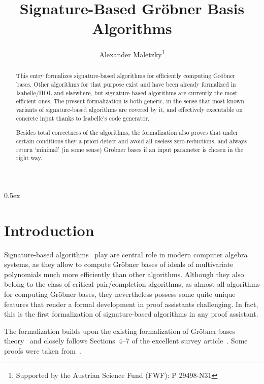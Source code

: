 \documentclass[11pt,a4paper]{article}
\begin{document}
\title{Signature-Based Gr\"obner Basis Algorithms}
\author{Alexander Maletzky\thanks{Supported by the Austrian Science Fund (FWF): P 29498-N31}}
\maketitle

\begin{abstract}
This entry formalizes signature-based algorithms for efficiently computing Gr\"obner bases. 
Other algorithms for that purpose exist and have been already formalized in Isabelle/HOL and 
elsewhere, but signature-based algorithms are currently the most efficient ones. The present 
formalization is both generic, in the sense that most known variants of signature-based algorithms 
are covered by it, and effectively executable on concrete input thanks to Isabelle's code generator.

Besides total correctness of the algorithms, the formalization also proves that under certain 
conditions they a-priori detect and avoid all useless zero-reductions, and always return `minimal' 
(in some sense) Gr\"obner bases if an input parameter is chosen in the right way.
\end{abstract}

\tableofcontents

\parindent 0pt\parskip 0.5ex

\newpage
\section{Introduction}

Signature-based algorithms~\cite{Faugere2002,Eder2017} play are central role in modern computer 
algebra systems, as they allow to compute Gr\"obner bases of ideals of multivariate polynomials much 
more efficiently than other algorithms. Although they also belong to the class of 
critical-pair/completion algorithms, as almost all algorithms for computing Gr\"obner bases, they 
nevertheless possess some quite unique features that render a formal development in proof assistants 
challenging. In fact, this is the first formalization of signature-based algorithms in any proof 
assistant.

The formalization builds upon the existing formalization of Gr\"obner bases 
theory~\cite{Immler2016} and closely follows Sections~4--7 of the excellent survey 
article~\cite{Eder2017}. Some proofs were taken from~\cite{Roune2012,Eder2013}.
\end{document}
